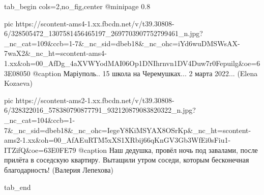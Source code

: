  
 
 
 
 

\clearpage
{}

\ifcmt
  tab_begin cols=2,no_fig,center
     @minipage 0.8

     pic https://scontent-ams4-1.xx.fbcdn.net/v/t39.30808-6/328505472_1307581456465197_2697703907752799461_n.jpg?_nc_cat=109&ccb=1-7&_nc_sid=dbeb18&_nc_ohc=iYd6wuDMSWsAX-7waX2&_nc_ht=scontent-ams4-1.xx&oh=00_AfDg_4aXVWYodMAI06Op1DNIhrnvn1DV4Duw7r0Fepuilg&oe=63E08050
     @caption Маріуполь.. 15 школа на Черемушках... 2 марта 2022... (Elena Kozaeva)

     pic https://scontent-ams2-1.xx.fbcdn.net/v/t39.30808-6/328322016_578380790877791_932120879083820322_n.jpg?_nc_cat=104&ccb=1-7&_nc_sid=dbeb18&_nc_ohc=IegeY8KiMSYAX8OSrKp&_nc_ht=scontent-ams2-1.xx&oh=00_AfAEuRTM5xXS1XRbij66qKnGV3Gb3WfEi0sFiu1-ITZifQ&oe=63E0FE79
     @caption Наш дедушка, провёл ночь под завалами, после прилёта в соседскую квартиру. Вытащили утром соседи, которым бесконечная благодарность! (Валерия Лепехова)

  tab_end
\fi
